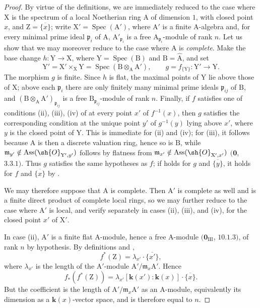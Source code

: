 \begin{proof}
By virtue of the definitions, we are immediately reduced to the case where $\mathrm{X}$ is the spectrum of a local Noetherian ring $\mathrm{A}$ of dimension $1$, with closed point $x$, and $\mathrm{Z}=\overline{\{x\}}$; write $\mathrm{X}'=\operatorname{Spec}(\mathrm{A}')$, where $\mathrm{A}'$ is a finite A-algebra and, for every minimal prime ideal $\mathfrak{p}_i$ of $\mathrm{A}$, $\mathrm{A}'_{\mathfrak{p}_i}$ is a free $\mathrm{A}_{\mathfrak{p}_i}$-module of rank $n$.
Let us show that we may moreover reduce to the case where $\mathrm{A}$ is \emph{complete}.  Make the base change $h:\mathrm{Y}\to\mathrm{X}$, where $\mathrm{Y}=\operatorname{Spec}(\mathrm{B})$ and $\mathrm{B}=\widehat{\mathrm{A}}$, and set
\[
  \mathrm{Y}'=\mathrm{X}'\times_{\mathrm{X}}\mathrm{Y}
  =\operatorname{Spec}(\mathrm{B}\otimes_{\mathrm{A}}\mathrm{A}'),
  \qquad g=f_{\{\mathrm{Y}\}}:\mathrm{Y}'\to\mathrm{Y}.
\]
The morphism $g$ is finite.  Since $h$ is flat, the maximal points of $\mathrm{Y}$ lie above those of $\mathrm{X}$; above each $\mathfrak{p}_i$ there are only finitely many minimal prime ideals $\mathfrak{p}_{ij}$ of $\mathrm{B}$, and $(\mathrm{B}\otimes_{\mathrm{A}}\mathrm{A}')_{\mathfrak{p}_{ij}}$ is a free $\mathrm{B}_{\mathfrak{p}_{ij}}$-module of rank $n$.
Finally, if $f$ satisfies one of conditions (ii), (iii), (iv) of  at every point $x'$ of $f^{-1}(x)$, then $g$ satisfies the corresponding condition at the unique point $y'$ of $g^{-1}(y)$ lying above $x'$, where $y$ is the closed point of $\mathrm{Y}$.  This is immediate for (ii) and (iv); for (iii), it follows because $\mathrm{A}$ is then a discrete valuation ring, hence so is $\mathrm{B}$, while
$\mathfrak{m}_{y'}\notin\operatorname{Ass}(\sh{O}_{\mathrm{Y}',y'})$ follows by flatness from $\mathfrak{m}_{x'}\notin\operatorname{Ass}(\sh{O}_{\mathrm{X}',x'})$ $(\mathbf{0}$, $3.3.1)$.
Thus $g$ satisfies the same hypotheses as $f$; if  holds for $g$ and $\overline{\{y\}}$, it holds for $f$ and $\overline{\{x\}}$ by .

We may therefore suppose that $\mathrm{A}$ is complete.  Then $\mathrm{A}'$ is complete as well and is a finite direct product of complete local rings, so we may further reduce to the case where $\mathrm{A}'$ is local, and verify  separately in cases (ii), (iii), and (iv), for the closed point $x'$ of $\mathrm{X}'$.

In case (ii), $\mathrm{A}'$ is a finite flat A-module, hence a free A-module $(\mathbf{0}_{\mathrm{III}}$, $10.1.3)$, of rank $n$ by hypothesis.  By definitions  and ,
\[
  f^*(\mathrm{Z})=\lambda_{x'}\cdot\overline{\{x'\}},
\]
where $\lambda_{x'}$ is the length of the $\mathrm{A}'$-module $\mathrm{A}'/\mathfrak{m}_x\mathrm{A}'$.  Hence
\[
  f_*(f^*(\mathrm{Z}))
  =\lambda_{x'}[\boldsymbol{k}(x'):\boldsymbol{k}(x)]\cdot\overline{\{x\}}.
\]
But the coefficient is the length of $\mathrm{A}'/\mathfrak{m}_x\mathrm{A}'$ as an A-module, equivalently its dimension as a $\boldsymbol{k}(x)$-vector space, and is therefore equal to $n$.


\end{proof}
